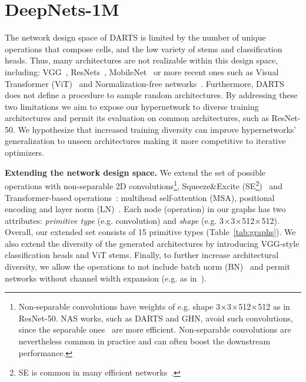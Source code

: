 
\vspace{-5pt}
\section{DeepNets-1M\label{sec:dataset}}
\vspace{-5pt}

The network design space of DARTS is limited by the number of unique operations that compose cells, and the low variety of stems and classification heads. Thus, many architectures are not realizable within this design space, including: VGG~\citep{simonyan2014very}, ResNets~\citep{he2016deep}, MobileNet~\citep{howard2019searching} or more recent ones such as Visual Transformer (ViT)~\citep{dosovitskiy2020image} and Normalization-free networks~\citep{brock2021characterizing,brock2021high}.
Furthermore, DARTS does not define a procedure to sample random architectures.	
By addressing these two limitations we aim to expose our hypernetwork to diverse training architectures and permit its evaluation on common architectures, such as ResNet-50. We hypothesize that increased training diversity can improve hypernetworks' generalization to unseen architectures making it more competitive to iterative optimizers.

\textbf{Extending the network design space.} We extend the set of possible operations with non-separable 2D convolutions\footnote{Non-separable convolutions have weights of e.g. shape 3${\mkern-0.1mu\times\mkern-0.1mu}$3${\mkern-0.1mu\times\mkern-0.1mu}$512${\mkern-0.1mu\times\mkern-0.1mu}$512 as in ResNet-50. NAS works, such as DARTS and GHN, avoid such convolutions, since the separable ones~\citep{sifre2014rigid} are more efficient. Non-separable convolutions are nevertheless common in practice and can often boost the downstream performance.}, Squeeze\&Excite (SE\footnote{SE is common in many efficient networks~\citep{howard2017mobilenets,cai2019onceforall}.})~\citep{hu2018squeeze} and Transformer-based operations~\citep{vaswani2017attention,dosovitskiy2020image}: multihead self-attention (MSA), positional encoding and layer norm (LN)~\citep{ba2016layer}. 
Each node (operation) in our graphs has two attributes: \emph{primitive type} (e.g. convolution) and \emph{shape} (e.g. 3${\mkern-0.1mu\times\mkern-0.1mu}$3${\mkern-0.1mu\times\mkern-0.1mu}$512${\mkern-0.1mu\times\mkern-0.1mu}$512). Overall, our extended set consists of 15 primitive types (Table~\ref{tab:graphs}).
We also extend the diversity of the generated architectures by introducing VGG-style classification heads and ViT stems. 
Finally, to further increase architectural diversity, we allow the operations to not include batch norm (BN)~\citep{ioffe2015batch} and permit networks without channel width expansion (e.g. as in~\citep{dosovitskiy2020image}).

